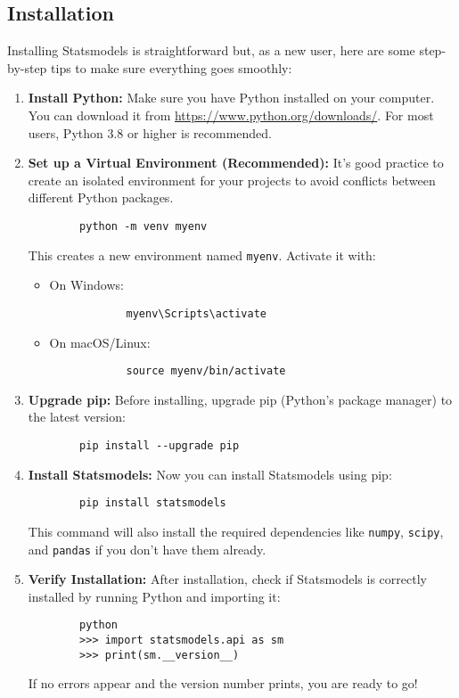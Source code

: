 \subsection{Installation}
Installing Statsmodels is straightforward but, as a new user, here are some step-by-step tips to make sure everything goes smoothly:

\begin{enumerate}
	\item \textbf{Install Python:}  
	Make sure you have Python installed on your computer. You can download it from \url{https://www.python.org/downloads/}. For most users, Python 3.8 or higher is recommended.
	
	\item \textbf{Set up a Virtual Environment (Recommended):}  
	It’s good practice to create an isolated environment for your projects to avoid conflicts between different Python packages.
	
	\begin{verbatim}
		python -m venv myenv
	\end{verbatim}
	
	This creates a new environment named \texttt{myenv}. Activate it with:
	\begin{itemize}
		\item On Windows:
		\begin{verbatim}
			myenv\Scripts\activate
		\end{verbatim}
		\item On macOS/Linux:
		\begin{verbatim}
			source myenv/bin/activate
		\end{verbatim}
	\end{itemize}
	
	\item \textbf{Upgrade pip:}  
	Before installing, upgrade pip (Python’s package manager) to the latest version:
	\begin{verbatim}
		pip install --upgrade pip
	\end{verbatim}
	
	\item \textbf{Install Statsmodels:}  
	Now you can install Statsmodels using pip:
	\begin{verbatim}
		pip install statsmodels
	\end{verbatim}
	This command will also install the required dependencies like \texttt{numpy}, \texttt{scipy}, and \texttt{pandas} if you don't have them already.
	
	\item \textbf{Verify Installation:}  
	After installation, check if Statsmodels is correctly installed by running Python and importing it:
	\begin{verbatim}
		python
		>>> import statsmodels.api as sm
		>>> print(sm.__version__)
	\end{verbatim}
	If no errors appear and the version number prints, you are ready to go!
	

\end{enumerate}
